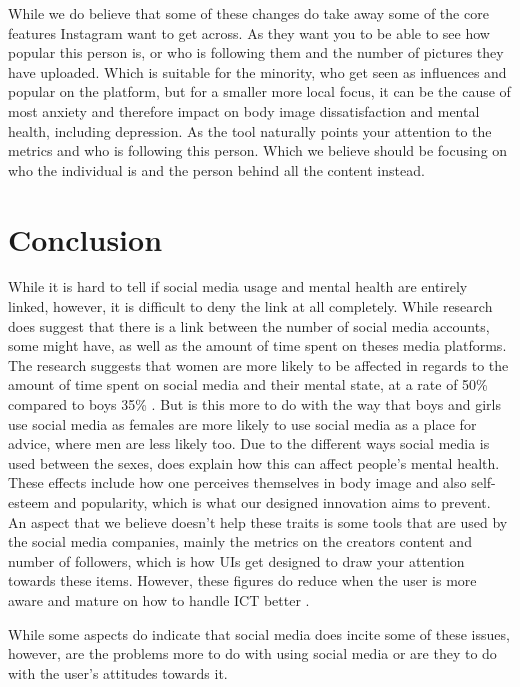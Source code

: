 \documentclass{sigchi}
\begin{document}
	While we do believe that some of these changes do take away some of the core features Instagram want to get across. As they want you to be able to see how popular this person is, or who is following them and the number of pictures they have uploaded. Which is suitable for the minority, who get seen as influences and popular on the platform, but for a smaller more local focus, it can be the cause of most anxiety and therefore impact on body image dissatisfaction and mental health, including depression. As the tool naturally points your attention to the metrics and who is following this person. Which we believe should be focusing on who the individual is and the person behind all the content instead.
	
\section{Conclusion}
	While it is hard to tell if social media usage and mental health are entirely linked, however, it is difficult to deny the link at all completely. While research does suggest that there is a link between the number of social media accounts, some might have, as well as the amount of time spent on theses media platforms. The research suggests that women are more likely to be affected in regards to the amount of time spent on social media and their mental state, at a rate of 50\% compared to boys 35\% \cite{kelly2018social}. But is this more to do with the way that boys and girls use social media as females are more likely to use social media as a place for advice, where men are less likely too. Due to the different ways social media is used between the sexes, does explain how this can affect people's mental health. These effects include how one perceives themselves in body image and also self-esteem and popularity, which is what our designed innovation aims to prevent. An aspect that we believe doesn't help these traits is some tools that are used by the social media companies, mainly the metrics on the creators content and number of followers, which is how UIs get designed to draw your attention towards these items. However, these figures do reduce when the user is more aware and mature on how to handle ICT better \cite{kraut2002internet}. 
	
	While some aspects do indicate that social media does incite some of these issues, however, are the problems more to do with using social media or are they to do with the user's attitudes towards it. 
	
	
\balance{}



\end{document}
